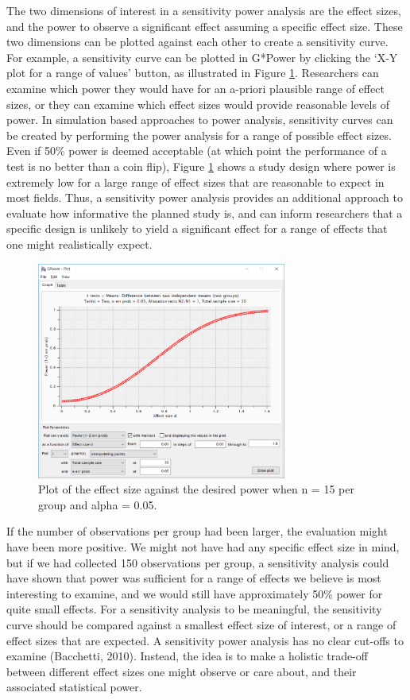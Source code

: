 \documentclass[
  english,
  ,jou, a4paper,floatsintext]{apa6}
\begin{document}
The two dimensions of interest in a sensitivity power analysis are the effect sizes, and the power to observe a significant effect assuming a specific effect size. These two dimensions can be plotted against each other to create a sensitivity curve. For example, a sensitivity curve can be plotted in G*Power by clicking the `X-Y plot for a range of values' button, as illustrated in Figure \ref{fig:gsens1}. Researchers can examine which power they would have for an a-priori plausible range of effect sizes, or they can examine which effect sizes would provide reasonable levels of power. In simulation based approaches to power analysis, sensitivity curves can be created by performing the power analysis for a range of possible effect sizes. Even if 50\% power is deemed acceptable (at which point the performance of a test is no better than a coin flip), Figure \ref{fig:gsens1} shows a study design where power is extremely low for a large range of effect sizes that are reasonable to expect in most fields. Thus, a sensitivity power analysis provides an additional approach to evaluate how informative the planned study is, and can inform researchers that a specific design is unlikely to yield a significant effect for a range of effects that one might realistically expect.

\begin{figure}
\includegraphics[width=3.23in]{images/sensitivity1} \caption{Plot of the effect size against the desired power when n = 15 per group and alpha = 0.05.}\label{fig:gsens1}
\end{figure}

If the number of observations per group had been larger, the evaluation might have been more positive. We might not have had any specific effect size in mind, but if we had collected 150 observations per group, a sensitivity analysis could have shown that power was sufficient for a range of effects we believe is most interesting to examine, and we would still have approximately 50\% power for quite small effects. For a sensitivity analysis to be meaningful, the sensitivity curve should be compared against a smallest effect size of interest, or a range of effect sizes that are expected. A sensitivity power analysis has no clear cut-offs to examine (Bacchetti, 2010). Instead, the idea is to make a holistic trade-off between different effect sizes one might observe or care about, and their associated statistical power.
\end{document}
